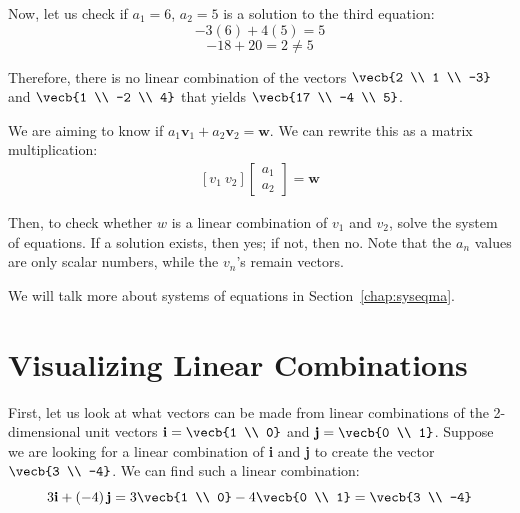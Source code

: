 Now, let us check if $a_1 = 6$, $a_2 = 5$ is a solution to the third equation:
$$-3 \left( 6 \right) + 4 \left( 5 \right) = 5$$
$$-18 + 20 = 2 \neq 5$$

Therefore, there is no linear combination of the vectors $\vecb{2 \\ 1 \\ -3}$ and $\vecb{1 \\ -2 \\ 4}$ that yields $\vecb{17 \\ -4 \\ 5}$.

\begin{mdframed}[style = important, frametitle = {Linear Combinations as systems.}]
We are aiming to know if $a_1 \mathbf{v}_1 + a_2 \mathbf{v}_2 = \mathbf{w}$. We can rewrite this as a matrix multiplication:
$$\begin{array}{c} [v_1 \ v_2] \begin{bmatrix} a_1 \\ a_2 \end{bmatrix} = \mathbf{w} \end{array}$$

Then, to check whether $w$ is a linear combination of $v_1$ and $v_2$, solve the system of equations. If a solution exists, then yes; if not, then no. Note that the $a_n$ values are only scalar numbers, while the $v_n$'s remain vectors.
\end{mdframed}
We will talk more about systems of equations in Section~\ref{chap:syseqma}.
\section{Visualizing Linear Combinations}
First, let us look at what vectors can be made from linear combinations of the 
2-dimensional unit vectors $\textbf{i} = \vecb{1 \\ 0}$ and $\textbf{j} 
= \vecb{0 \\ 1}$. Suppose we are looking for a linear combination of 
\textbf{i} and \textbf{j} to create the vector $\vecb{3 \\ -4}$. We can 
find such a linear combination:
$$3\textbf{i} + \left( -4 \right) \textbf{j} = 3 \vecb{1 \\ 0} - 4 \vecb{0 \\ 1} = \vecb{3 \\ -4}$$

